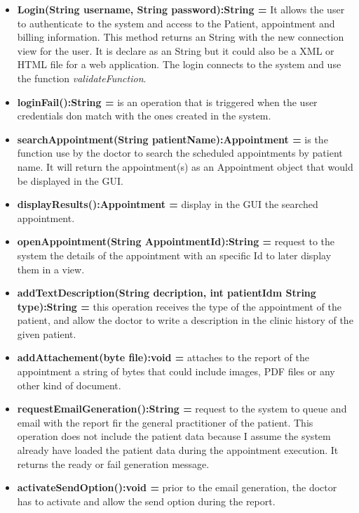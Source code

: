 \documentclass{article}
\begin{document}
            \begin{itemize}
                \item \textbf{Login(String username, String password):String =}  It allows the user to authenticate to the system and access to the Patient, appointment and billing information. This method returns an String with the new connection view for the user. It is declare as an
                String but it could also be a XML or HTML file for a web application. The login connects to the system and use the function \textit{validateFunction}.
                \item \textbf{loginFail():String =} is an operation that is triggered when the user credentials don match with the ones created in the system.
                \item \textbf{searchAppointment(String patientName):Appointment = } is the function use by the doctor to search the scheduled appointments by patient name. It will return the appointment(s) as an Appointment object that would be displayed in the GUI.
                \item \textbf{displayResults():Appointment = } display in the GUI the searched appointment.
                \item \textbf{openAppointment(String AppointmentId):String = }  request to the system the details of the appointment with an specific Id to later display them in a view.
                \item \textbf{addTextDescription(String decription, int patientIdm String type):String = } this operation receives the type of the appointment of the patient, and allow the doctor to write a description in the clinic history of the given patient.
                \item \textbf{addAttachement(byte file):void = } attaches to the report of the appointment  a string of bytes that could include images, PDF files or any other kind of document.
                \item \textbf{requestEmailGeneration():String = } request to the system to queue and email with the report fir the general practitioner of the patient. This operation does not include the patient data because I assume the system already have loaded the patient data during the appointment execution.
                It returns the ready or fail generation message.
                \item \textbf{activateSendOption():void = } prior to the email generation, the doctor has to activate and allow the send option during the report.

\end{itemize}
\end{document}

